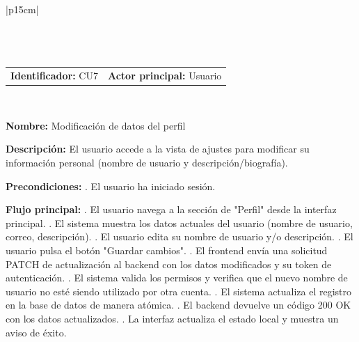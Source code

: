 \begingroup
{}
\setlength{\arrayrulewidth}{1pt}
\begin{longtable}{|p{15cm}|}
  \hline
   \\
  \hline
  \endfirsthead
   \\
  \hline
   \\
  \hline
  \endhead
  \hline {} \\ \hline
  \endfoot
  \hline
  \caption{Caso de Uso CU7 — Modificación de datos del perfil.}
  \label{TB:CU7_PERFIL_DATOS}
  \endlastfoot

  \begin{tabularx}{\linewidth}{@{}X X@{}}
    \textbf{Identificador:} CU7 & \textbf{Actor principal:} Usuario
  \end{tabularx} \\ \hline

  \textbf{Nombre:} Modificación de datos del perfil \\ \hline

  \textbf{Descripción:} \newline 
  El usuario accede a la vista de ajustes para modificar su información personal (nombre de usuario y descripción/biografía). \\ \hline

  \textbf{Precondiciones:} . El usuario ha iniciado sesión. \\ \hline

  \textbf{Flujo principal:} . El usuario navega a la sección de "Perfil" desde la interfaz principal. . El sistema muestra los datos actuales del usuario (nombre de usuario, correo, descripción). . El usuario edita su nombre de usuario y/o descripción. . El usuario pulsa el botón "Guardar cambios". . El frontend envía una solicitud PATCH de actualización al backend con los datos modificados y su token de autenticación. . El sistema valida los permisos y verifica que el nuevo nombre de usuario no esté siendo utilizado por otra cuenta. . El sistema actualiza el registro en la base de datos de manera atómica. . El backend devuelve un código 200 OK con los datos actualizados. . La interfaz actualiza el estado local y muestra un aviso de éxito. \\ \hline


\end{longtable}
